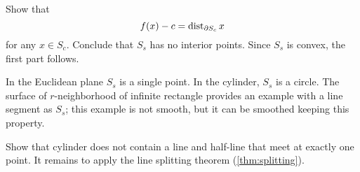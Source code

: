 Show that 
\[f(x)-c=\mathop{\rm dist}\nolimits_{\partial S_c}x\]
for any $x\in S_c$.
Conclude that $S_s$ has no interior points.
Since $S_s$ is convex, the first part follows.

In the Euclidean plane $S_s$ is a single point.
In the cylinder, $S_s$ is a circle.
The surface of $r$-neighborhood of infinite rectangle provides an example with a line segment as $S_s$; this example is not smooth, but it can be smoothed keeping this property.



Show that cylinder does not contain a line and half-line that meet at exactly one point.
It remains to apply the line splitting theorem (\ref{thm:splitting}).


